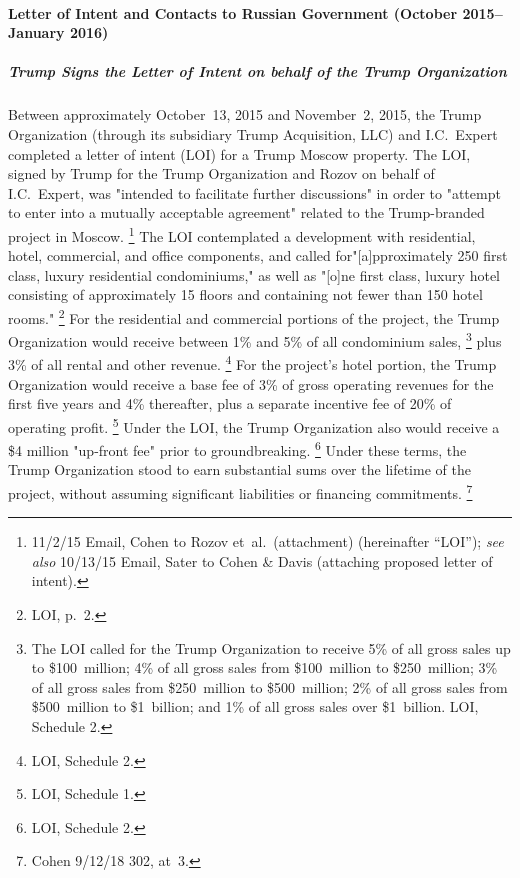 \paragraph{Letter of Intent and Contacts to Russian Government (October 2015--January 2016)}

\subparagraph{Trump Signs the Letter of Intent on behalf of the Trump Organization}

Between approximately October~13, 2015 and November~2, 2015, the Trump Organization (through its subsidiary Trump Acquisition, LLC) and I.C.~Expert completed a letter of intent (LOI) for a Trump Moscow property.
The LOI, signed by Trump for the Trump Organization and Rozov on behalf of I.C.~Expert, was "intended to facilitate further discussions" in order to "attempt to enter into a mutually acceptable agreement" related to the Trump-branded project in Moscow.%
\footnote{11/2/15 Email, Cohen to Rozov et~al.\ (attachment) (hereinafter ``LOI'');
\textit{see also} 10/13/15 Email, Sater to Cohen \& Davis (attaching proposed letter of intent).}
The LOI contemplated a development with residential, hotel, commercial, and office components, and called for"[a]pproximately 250 first class, luxury residential condominiums," as well as "[o]ne first class, luxury hotel consisting of approximately 15 floors and containing not fewer than 150 hotel rooms."%
\footnote{LOI, p.~2.}
For the residential and commercial portions of the project, the Trump Organization would receive between 1\% and 5\% of all condominium sales,%
\footnote{The LOI called for the Trump Organization to receive 5\% of all gross sales up to \$100~million;
4\% of all gross sales from \$100~million to \$250~million;
3\% of all gross sales from \$250~million to \$500~million;
2\% of all gross sales from \$500~million to \$1~billion;
and 1\% of all gross sales over \$1~billion.
LOI, Schedule 2.}
plus 3\% of all rental and other revenue.%
\footnote{LOI, Schedule 2.}
For the project's hotel portion, the Trump Organization would receive a base fee of 3\% of gross operating revenues for the first five years and 4\% thereafter, plus a separate incentive fee of 20\% of operating profit.%
\footnote{LOI, Schedule 1.}
Under the LOI, the Trump Organization also would receive a \$4 million "up-front fee" prior to groundbreaking.%
\footnote{LOI, Schedule 2.}
Under these terms, the Trump Organization stood to earn substantial sums over the lifetime of the project, without assuming significant liabilities or financing commitments.%
\footnote{Cohen 9/12/18 302, at~3.}

